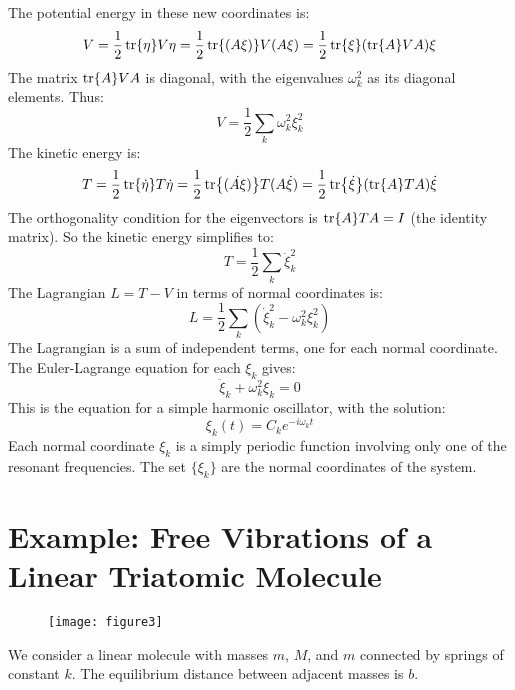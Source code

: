 \documentclass[12pt]{article}
\begin{document}
	The potential energy in these new coordinates is:
	\[
	V = \frac{1}{2} \tr{\eta} V \eta = \frac{1}{2} \tr{(A\xi)} V (A\xi) = \frac{1}{2} \tr{\xi} (\tr{A} V A) \xi
	\]
	The matrix $\tr{A}VA$ is diagonal, with the eigenvalues $\omega_k^2$ as its diagonal elements. Thus:
	\[
	V = \frac{1}{2} \sum_k \omega_k^2 \xi_k^2
	\]
	The kinetic energy is:
	\[
	T = \frac{1}{2} \tr{\dot{\eta}} T \dot{\eta} = \frac{1}{2} \tr{(\dot{A\xi})} T (A\dot{\xi}) = \frac{1}{2} \tr{\dot{\xi}} (\tr{A} T A) \dot{\xi}
	\]
	The orthogonality condition for the eigenvectors is $\tr{A}TA = I$ (the identity matrix). So the kinetic energy simplifies to:
	\[
	T = \frac{1}{2} \sum_k \dot{\xi}_k^2
	\]
	The Lagrangian $L = T-V$ in terms of normal coordinates is:
	\[
	L = \frac{1}{2} \sum_k (\dot{\xi}_k^2 - \omega_k^2 \xi_k^2)
	\]
	The Lagrangian is a sum of independent terms, one for each normal coordinate. The Euler-Lagrange equation for each $\xi_k$ gives:
	\[
	\ddot{\xi}_k + \omega_k^2 \xi_k = 0
	\]
	This is the equation for a simple harmonic oscillator, with the solution:
	\[
	\xi_k(t) = C_k e^{-i\omega_k t}
	\]
	Each normal coordinate $\xi_k$ is a simply periodic function involving only one of the resonant frequencies. The set $\{\xi_k\}$ are the normal coordinates of the system.
	
	\section{Example: Free Vibrations of a Linear Triatomic Molecule}
	
	\begin{figure}[h]
		\centering
		\texttt{[image: figure3]}
		\caption{}
		\label{fig:figure3}
	\end{figure}
	
	We consider a linear molecule with masses $m$, $M$, and $m$ connected by springs of constant $k$. The equilibrium distance between adjacent masses is $b$.
	
\end{document}
